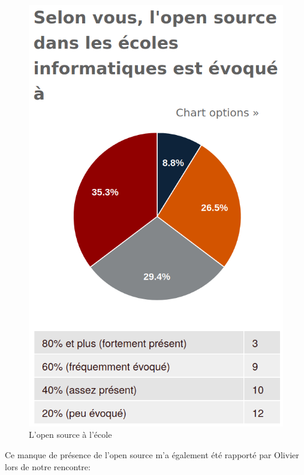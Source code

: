 				\begin{figure}[!htb]
					\center
					\includegraphics[scale=0.28]{./img/osalecole}
					\caption{L'open source à l'école}					
				\end{figure}

				Ce manque de présence de l'open source m'a également été rapporté par Olivier  lors de notre rencontre:

				\begin{center}
					\textit{
					}
				\end{center}

